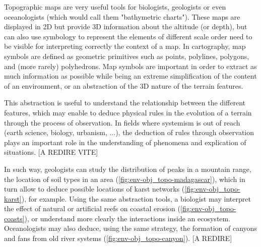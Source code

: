 Topographic maps are very useful tools for biologists, geologists or even oceanologists (which would call them "bathymetric charts"). These maps are displayed in 2D but provide 3D information about the altitude (or depth), but can also use symbology to represent the elements of different scale order need to be visible for interpreting correctly the context of a map. In cartography, map symbols are defined as geometric primitives such as points, polylines, polygons, and (more rarely) polyhedrons. Map symbols are important in order to extract as much information as possible while being an extreme simplification of the content of an environment, or an abstraction of the 3D nature of the terrain features. 

This abstraction is useful to understand the relationship between the different features, which may enable to deduce physical rules in the evolution of a terrain through the process of observation. In fields where systemism is out of reach (earth science, biology, urbanism, ...), the deduction of rules through observation plays an important role in the understanding of phenomena and explication of situations. [A REDIRE VITE]

In such way, geologists can study the distribution of peaks in a mountain range, the location of soil types in an area (\cref{fig:env-obj_topo-madagascar}), which in turn allow to deduce possible locations of karst networks (\cref{fig:env-obj_topo-karst}), for example. Using the same abstraction tools, a biologist may interpret the effect of natural or artificial reefs on coastal erosion (\cref{fig:env-obj_topo-coasts}), or understand more clearly the interactions inside an ecosystem. Oceanologists may also deduce, using the same strategy, the formation of canyons and fans from old river systems (\cref{fig:env-obj_topo-canyon}). [A REDIRE]



